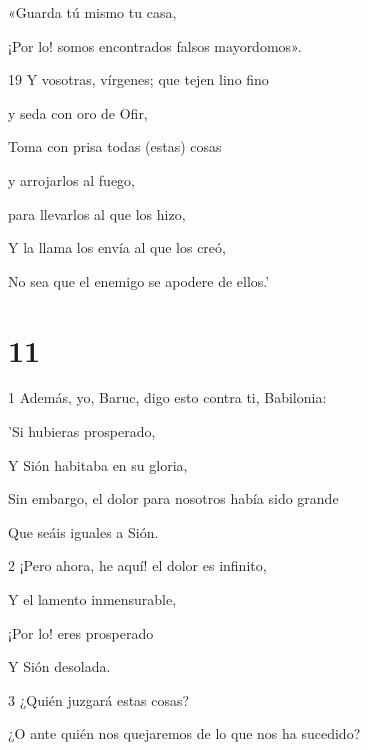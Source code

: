 \par «Guarda tú mismo tu casa,

\par ¡Por lo! somos encontrados falsos mayordomos».

\par 19 Y vosotras, vírgenes; que tejen lino fino

\par y seda con oro de Ofir,

\par Toma con prisa todas (estas) cosas

\par y arrojarlos al fuego,

\par para llevarlos al que los hizo,

\par Y la llama los envía al que los creó,

\par No sea que el enemigo se apodere de ellos.'

\chapter{11}

\par 1 Además, yo, Baruc, digo esto contra ti, Babilonia:

\par 'Si hubieras prosperado,

\par Y Sión habitaba en su gloria,

\par Sin embargo, el dolor para nosotros había sido grande

\par Que seáis iguales a Sión.

\par 2 ¡Pero ahora, he aquí! el dolor es infinito,

\par Y el lamento inmensurable,

\par ¡Por lo! eres prosperado

\par Y Sión desolada.

\par 3 ¿Quién juzgará estas cosas?

\par ¿O ante quién nos quejaremos de lo que nos ha sucedido?

